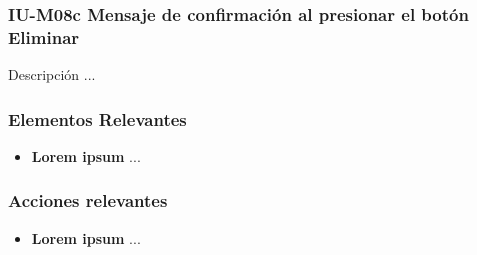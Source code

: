 
\subsubsection{IU-M08c Mensaje de confirmación al presionar el botón Eliminar}

 Descripción ...


\subsubsection{Elementos Relevantes}

    \begin{itemize}
    \item {\bf Lorem ipsum}
        ...
    \end{itemize}

\subsubsection{Acciones relevantes}

    \begin{itemize}
    \item {\bf Lorem ipsum}
        ...
    \end{itemize}

\clearpage
